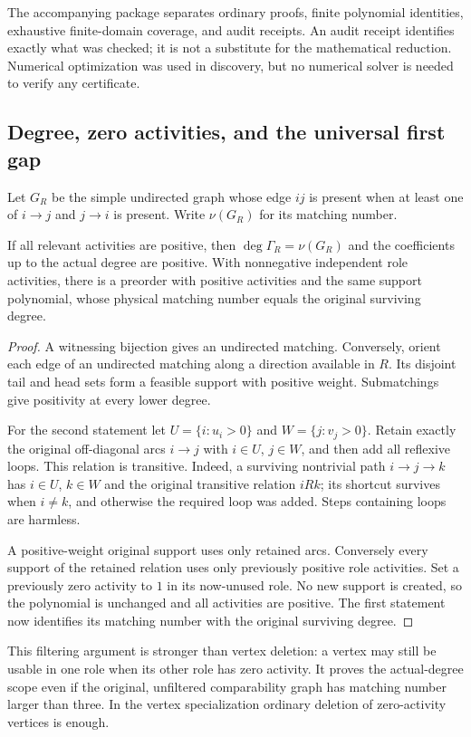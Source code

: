 \documentclass[11pt]{article}
\numberwithin{equation}{section}
\theoremstyle{definition}\newtheorem{definition}[theorem]{Definition}\newtheorem{remark}[theorem]{Remark}
\newcommand{\Ga}{\Gamma}                   %
\begin{document}
The accompanying package separates ordinary proofs, finite polynomial identities, exhaustive finite-domain coverage, and audit receipts. An audit receipt identifies exactly what was checked; it is not a substitute for the mathematical reduction. Numerical optimization was used in discovery, but no numerical solver is needed to verify any certificate.

\subsection{Degree, zero activities, and the universal first gap}\label{pgr:r:ir:sec:first}
Let $G_R$ be the simple undirected graph whose edge $ij$ is present when at least one of $i\to j$ and $j\to i$ is present. Write $\nu(G_R)$ for its matching number.

\begin{lemma}\label{pgr:r:ir:lem:degree}
If all relevant activities are positive, then $\deg\Ga_R=\nu(G_R)$ and the coefficients up to the actual degree are positive. With nonnegative independent role activities, there is a preorder with positive activities and the same support polynomial, whose physical matching number equals the original surviving degree.
\end{lemma}
\begin{proof}
A witnessing bijection gives an undirected matching. Conversely, orient each edge of an undirected matching along a direction available in $R$. Its disjoint tail and head sets form a feasible support with positive weight. Submatchings give positivity at every lower degree.

For the second statement let $U=\{i:u_i>0\}$ and $W=\{j:v_j>0\}$. Retain exactly the original off-diagonal arcs $i\to j$ with $i\in U$, $j\in W$, and then add all reflexive loops. This relation is transitive. Indeed, a surviving nontrivial path $i\to j\to k$ has $i\in U$, $k\in W$ and the original transitive relation $iRk$; its shortcut survives when $i\ne k$, and otherwise the required loop was added. Steps containing loops are harmless.

A positive-weight original support uses only retained arcs. Conversely every support of the retained relation uses only previously positive role activities. Set a previously zero activity to $1$ in its now-unused role. No new support is created, so the polynomial is unchanged and all activities are positive. The first statement now identifies its matching number with the original surviving degree.
\end{proof}
This filtering argument is stronger than vertex deletion: a vertex may still be usable in one role when its other role has zero activity. It proves the actual-degree scope even if the original, unfiltered comparability graph has matching number larger than three. In the vertex specialization ordinary deletion of zero-activity vertices is enough.
\end{document}
